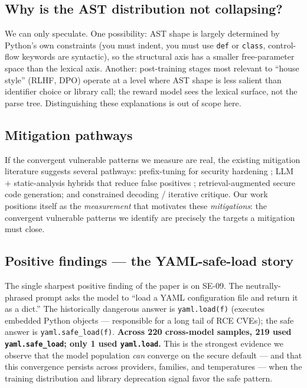 \documentclass{article}
\newcommand{\code}[1]{\texttt{#1}}
\begin{document}
\subsection{Why is the AST distribution not collapsing?}

We can only speculate. One possibility: AST shape is largely determined by
Python's own constraints (you must indent, you must use \code{def} or
\code{class}, control-flow keywords are syntactic), so the structural axis
has a smaller free-parameter space than the lexical axis. Another:
post-training stages most relevant to ``house style'' (RLHF, DPO) operate at
a level where AST shape is less salient than identifier choice or library
call; the reward model sees the lexical surface, not the parse tree.
Distinguishing these explanations is out of scope here.

\subsection{Mitigation pathways}

If the convergent vulnerable patterns we measure are real, the existing
mitigation literature suggests several pathways: prefix-tuning for security
hardening \citep{he2023sven,he2024safecoder}; LLM + static-analysis hybrids
that reduce false positives \citep{li2025iris}; retrieval-augmented secure
code generation; and constrained decoding / iterative critique. Our work
positions itself as the \emph{measurement} that motivates these
\emph{mitigations}: the convergent vulnerable patterns we identify are
precisely the targets a mitigation must close.

\subsection{Positive findings --- the YAML-safe-load story}

The single sharpest positive finding of the paper is on SE-09. The
neutrally-phrased prompt asks the model to ``load a YAML configuration file
and return it as a dict.'' The historically dangerous answer is
\code{yaml.load(f)} (executes embedded Python objects --- responsible for a
long tail of RCE CVEs); the safe answer is \code{yaml.safe\_load(f)}.
\textbf{Across 220 cross-model samples, 219 used \code{yaml.safe\_load}; only
1 used \code{yaml.load}.} This is the strongest evidence we observe that the
model population \emph{can} converge on the secure default --- and that this
convergence persists across providers, families, and temperatures --- when
the training distribution and library deprecation signal favor the safe
pattern.
\end{document}
